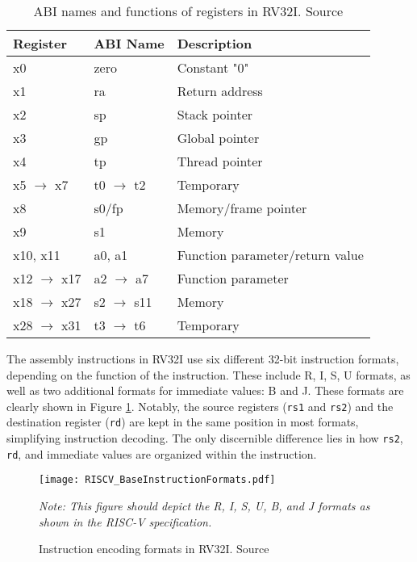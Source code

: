 \begin{table}[h!]
    \centering
    \caption{ABI names and functions of registers in RV32I. Source \cite{waterman2014riscv}}
    \label{tab:rv32i_registers}
    \begin{tabular}{lll}
    \toprule
    Register & ABI Name & Description \\
    \midrule
    x0 & zero & Constant "0" \\
    x1 & ra & Return address \\
    x2 & sp & Stack pointer \\
    x3 & gp & Global pointer \\
    x4 & tp & Thread pointer \\
    x5 $\to$ x7 & t0 $\to$ t2 & Temporary \\
    x8 & s0/fp & Memory/frame pointer \\
    x9 & s1 & Memory \\
    x10, x11 & a0, a1 & Function parameter/return value \\
    x12 $\to$ x17 & a2 $\to$ a7 & Function parameter \\
    x18 $\to$ x27 & s2 $\to$ s11 & Memory \\
    x28 $\to$ x31 & t3 $\to$ t6 & Temporary \\
    \bottomrule
    \end{tabular}
\end{table}

The assembly instructions in RV32I use six different 32-bit instruction formats, depending on the function of the instruction. These include R, I, S, U formats, as well as two additional formats for immediate values: B and J. These formats are clearly shown in Figure \ref{fig:rv32i_formats}. Notably, the source registers (\texttt{rs1} and \texttt{rs2}) and the destination register (\texttt{rd}) are kept in the same position in most formats, simplifying instruction decoding. The only discernible difference lies in how \texttt{rs2}, \texttt{rd}, and immediate values are organized within the instruction.

\begin{figure}[h!]
    \centering
    \texttt{[image: RISCV\_BaseInstructionFormats.pdf]}
    \caption{Instruction encoding formats in RV32I. Source \cite{waterman2014riscv}}
    \label{fig:rv32i_formats}
    \textit{Note: This figure should depict the R, I, S, U, B, and J formats as shown in the RISC-V specification.}
\end{figure}

